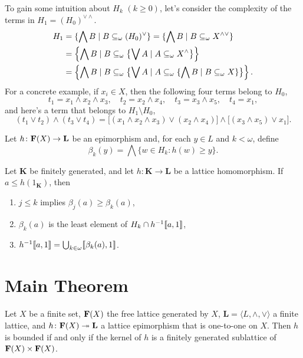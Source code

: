 To gain some intuition about $H_k$ $(k\geq 0)$, let's consider the complexity 
of the terms in $H_1 = (H_0)^{\vee \wedge}$. 
\begin{align*}
  H_1 &= \{\bigwedge B \mid B \subseteq_{\omega} (H_0)^{\vee}\}= \{\bigwedge B \mid B \subseteq_{\omega} X^{\wedge \vee}\}\\
      &= \left\{\bigwedge B \mid B \subseteq_{\omega} \bigl\{\bigvee A \mid A \subseteq_{\omega} X^\wedge \bigr\}\right\}\\
      &= \left\{\bigwedge B \mid B \subseteq_{\omega} \bigl\{\bigvee A \mid A \subseteq_{\omega} \{\bigwedge B \mid B \subseteq_{\omega} X\} \bigr\}\right\}.
\end{align*}
For a concrete example, if $x_i \in X$, then the following four
terms belong to $H_0$,
\[
t_1 = x_1 \wedge x_2 \wedge x_3, \quad t_2 = x_2 \wedge x_4, \quad t_3 = x_3 \wedge x_5, \quad t_4 = x_1,
\]
and here's a term that belongs to $H_1 \setminus H_0$,
\[
(t_1 \vee t_2) \wedge (t_3 \vee t_4) = \bigl[(x_1 \wedge x_2 \wedge x_3) \vee (x_2 \wedge x_4)\bigr] \wedge \bigl[(x_3 \wedge x_5)\vee x_1\bigr].
\]

Let $h \colon  \mathbf{F}(X) \to \mathbf{L}$ be an epimorphism and, 
for each $y \in L$ and $k< \omega$, define
\[
\beta_k(y) = \bigwedge \{w \in H_k : h(w) \geqslant y\}.
\]

\begin{theorem}\label{thm:2.2}
   Let $\mathbf K$ be finitely generated, and let $h \colon \mathbf K \to \mathbf L$ be a lattice
  homomorphism. If $a \leq h(1_{\mathbf K})$, then
\begin{enumerate}
\item $j \leq k$ implies $\beta_j(a) \geq \beta_k(a)$,
\item  $\beta_k(a)$ is the least element of $H_k \cap h^{-1}\llbracket a, 1 \rrbracket$,
\item  $h^{-1}\llbracket a, 1 \rrbracket = \bigcup_{k\in \omega}\llbracket \beta_k(a), 1 \rrbracket$.
\end{enumerate}  
\end{theorem}

\section{Main Theorem}

\begin{theorem}
\label{thm:main}
Let $X$ be a finite set, $\mathbf{F} (X)$ the free lattice 
generated by $X$, $\mathbf L = \langle L, \wedge, \vee\rangle$ a finite lattice, and 
$h\colon \mathbf{F}(X) \twoheadrightarrow \mathbf{L}$ a lattice epimorphism 
that is one-to-one on $X$.
Then $h$ is bounded if and only if the kernel of $h$ is a finitely generated 
sublattice of $\mathbf{F} (X) \times \mathbf{F} (X)$.
\end{theorem}

